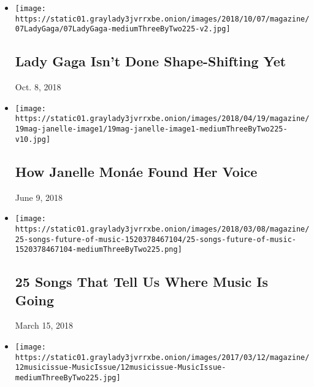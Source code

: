 \begin{itemize}
\item
  \href{https://www.nytimes3xbfgragh.onion/interactive/2018/10/03/magazine/lady-gaga-movie-star-is-born.html}{}

  \texttt{[image: https://static01.graylady3jvrrxbe.onion/images/2018/10/07/magazine/07LadyGaga/07LadyGaga-mediumThreeByTwo225-v2.jpg]}

  \hypertarget{lady-gaga-isnt-done-shape-shifting-yet}{%
  \subsection{Lady Gaga Isn't Done Shape-Shifting
  Yet}\label{lady-gaga-isnt-done-shape-shifting-yet}}

  Oct. 8, 2018
\item
  \href{https://www.nytimes3xbfgragh.onion/2018/04/19/magazine/how-janelle-monae-found-her-voice.html}{}

  \texttt{[image: https://static01.graylady3jvrrxbe.onion/images/2018/04/19/magazine/19mag-janelle-image1/19mag-janelle-image1-mediumThreeByTwo225-v10.jpg]}

  \hypertarget{how-janelle-monuxe1e-found-her-voice}{%
  \subsection{How Janelle Monáe Found Her
  Voice}\label{how-janelle-monuxe1e-found-her-voice}}

  June 9, 2018
\item
  \href{https://www.nytimes3xbfgragh.onion/interactive/2018/03/08/magazine/25-songs-future-of-music.html}{}

  \texttt{[image: https://static01.graylady3jvrrxbe.onion/images/2018/03/08/magazine/25-songs-future-of-music-1520378467104/25-songs-future-of-music-1520378467104-mediumThreeByTwo225.png]}

  \hypertarget{25-songs-that-tell-us-where-music-is-going}{%
  \subsection{25 Songs That Tell Us Where Music Is
  Going}\label{25-songs-that-tell-us-where-music-is-going}}

  March 15, 2018
\item
  \href{https://www.nytimes3xbfgragh.onion/interactive/2017/03/09/magazine/25-songs-that-tell-us-where-music-is-going.html}{}

  \texttt{[image: https://static01.graylady3jvrrxbe.onion/images/2017/03/12/magazine/12musicissue-MusicIssue/12musicissue-MusicIssue-mediumThreeByTwo225.jpg]}


\end{itemize}
